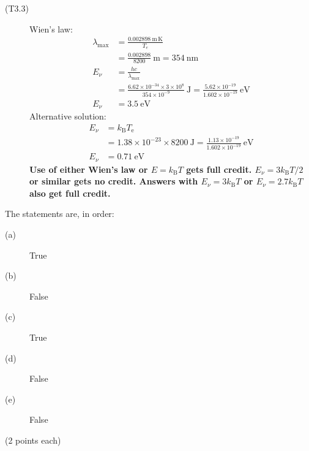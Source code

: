 \begin{description}
\item[(T3.3)] Wien's law:
\begin{align*}
\lambda_{\max} &= \frac{0.002898\ \mathrm{m\,K}}{T_e}\\
  &= \frac{0.002898}{8200}\ \mathrm{m} = 354\ \mathrm{nm} \tag*{(1.0)}\\
E_\nu &= \frac{hc}{\lambda_{\max}}\\
  &= \frac{6.62\times10^{-34}\times3\times10^{8}}{354\times10^{-9}}\
     \mathrm{J}
   = \frac{5.62\times10^{-19}}{1.602\times10^{-19}}\ \mathrm{eV}
  \tag*{(1.0)}\\
E_\nu &= 3.5\ \mathrm{eV} \tag*{(1.0)}
\end{align*}
Alternative solution:
\begin{align*}
E_\nu &= k_{\mathrm{B}}T_{\mathrm{e}}\\
  &= 1.38\times10^{-23}\times8200\ \mathrm{J}
   = \frac{1.13\times10^{-19}}{1.602\times10^{-19}}\ \mathrm{eV}
  \tag*{(2.0)}\\
E_\nu &= 0.71\ \mathrm{eV} \tag*{(1.0)}
\end{align*}
\textbf{Use of either Wien's law or $E = k_{\mathrm{B}}T$ gets full credit.
$E_\nu = 3k_{\mathrm{B}}T/2$ or similar gets no credit. Answers with
$E_\nu = 3k_{\mathrm{B}}T$ or $E_\nu = 2.7k_{\mathrm{B}}T$ also get full
credit.}
\end{description}

The statements are, in order:

\begin{description}
\item[(a)] True
\item[(b)] False
\item[(c)] True
\item[(d)] False
\item[(e)] False
\end{description}

\hfill(2 points each)

